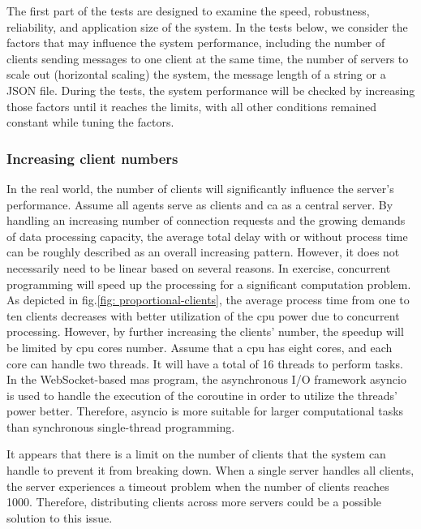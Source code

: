 The first part of the tests are designed to examine the speed, robustness, 
reliability, and application size of the system. In the tests below, we consider the factors that may influence 
the system performance, including the number of clients sending messages to one client 
at the same time, the number of servers to scale out (horizontal scaling) the system, 
the message length of a string or a JSON file. During the tests, the system performance 
will be checked by increasing those factors until it reaches the 
limits, with all other conditions remained constant while tuning the factors.


\subsubsection{Increasing client numbers}
In the real world, the number of clients will significantly influence the server's 
performance. Assume all agents serve as clients and \gls{ca} as a central server. 
By handling an increasing number of connection requests and the growing demands of 
data processing capacity, the average total delay with or without process time can 
be roughly described as an overall increasing pattern. However, it does not necessarily 
need to be linear based on several reasons. In exercise, concurrent programming will 
speed up the processing for a significant computation problem. As depicted in 
fig.\ref{fig: proportional-clients}, the average process time from one to ten clients 
decreases with better utilization of the \gls{cpu} power due to concurrent processing. 
However, by further increasing the clients' number, the speedup will be limited 
by \gls{cpu} cores number. Assume that a \gls{cpu} has eight cores, and each core 
can handle two threads. It will have a total of 16 threads to perform tasks. In the 
WebSocket-based \gls{mas} program, the asynchronous I/O framework asyncio is used 
to handle the execution of the coroutine in order to utilize the threads' power 
better.
Therefore, asyncio is more suitable for larger computational tasks than synchronous 
single-thread programming.

It appears that there is a limit on the number of clients that the system can handle 
to prevent it from breaking down. When a single server handles all clients, the 
server experiences a timeout problem when the number of clients reaches 1000. 
Therefore, distributing clients across more servers could be a possible solution 
to this issue.


